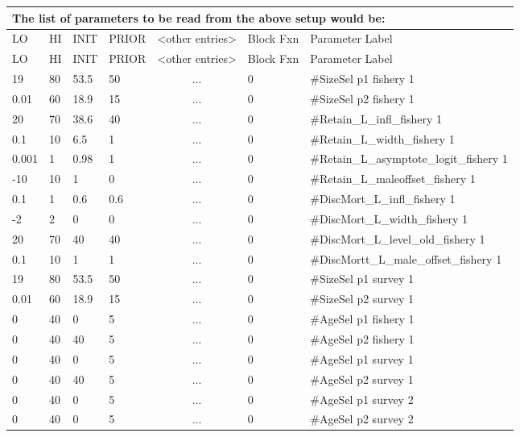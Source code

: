 \begin{longtable}{p{1cm} p{1cm} p{1cm} p{1.5cm} p{2.9cm} p{1.9cm} p{4.2cm}}
	\multicolumn{7}{l}{The list of parameters to be read from the above setup would be:} \\
	\hline
	LO \Tstrut & HI & INIT & PRIOR & <other entries> & Block Fxn & Parameter Label \Bstrut\\
	\hline
	\endfirsthead

	\hline
	LO \Tstrut & HI & INIT & PRIOR & <other entries> & Block Fxn & Parameter Label \Bstrut\\
	\hline
	\endhead
		
	19    & 80   & 53.5 & 50  & \multicolumn{1}{c}{...}  & 0   & \#SizeSel p1 fishery 1 \Tstrut\\
	0.01  & 60   & 18.9 & 15  & \multicolumn{1}{c}{...}  & 0   & \#SizeSel p2 fishery 1 \\
	20    & 70   & 38.6 & 40  & \multicolumn{1}{c}{...}  & 0   & \#Retain\_L\_infl\_fishery 1 \\
	0.1   & 10   & 6.5  & 1   & \multicolumn{1}{c}{...}  & 0   & \#Retain\_L\_width\_fishery 1 \\
	0.001 & 1    & 0.98 & 1   & \multicolumn{1}{c}{...}  & 0   & \#Retain\_L\_asymptote\_logit\_fishery 1 \\
	-10   & 10   & 1    & 0   & \multicolumn{1}{c}{...}  & 0   & \#Retain\_L\_maleoffset\_fishery 1 \\
	0.1   & 1    & 0.6  & 0.6 & \multicolumn{1}{c}{...}  & 0   & \#DiscMort\_L\_infl\_fishery 1 \\
	-2    & 2    & 0    & 0   & \multicolumn{1}{c}{...}  & 0   & \#DiscMort\_L\_width\_fishery 1 \\
	20    & 70   & 40   & 40  & \multicolumn{1}{c}{...}  & 0   & \#DiscMort\_L\_level\_old\_fishery 1 \\
	0.1   & 10   & 1    & 1   & \multicolumn{1}{c}{...}  & 0   & \#DiscMortt\_L\_male\_offset\_fishery 1 \\
	19    & 80   & 53.5 & 50  & \multicolumn{1}{c}{...}  & 0   & \#SizeSel p1 survey 1 \\
	0.01  & 60   & 18.9 & 15  & \multicolumn{1}{c}{...}  & 0   & \#SizeSel p2 survey 1 \\
	0     & 40   & 0    & 5   & \multicolumn{1}{c}{...}  & 0   & \#AgeSel p1 fishery 1 \\
	0     & 40   & 40   & 5   & \multicolumn{1}{c}{...}  & 0   & \#AgeSel p2 fishery 1 \\
	0     & 40   & 0    & 5   & \multicolumn{1}{c}{...}  & 0   & \#AgeSel p1 survey 1 \\
	0     & 40   & 40   & 5   & \multicolumn{1}{c}{...}  & 0   & \#AgeSel p2 survey 1 \\
	0     & 40   & 0    & 5   & \multicolumn{1}{c}{...}  & 0   & \#AgeSel p1 survey 2 \\
	0     & 40   & 0    & 5   & \multicolumn{1}{c}{...}  & 0   & \#AgeSel p2 survey 2 \Bstrut\\
	\hline
\end{longtable}


